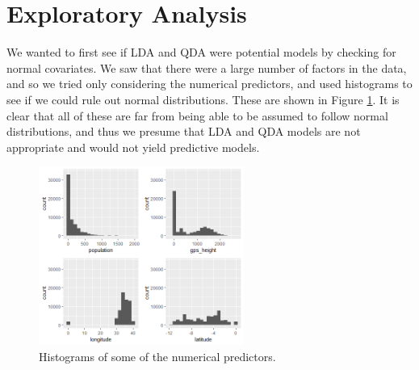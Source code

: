 \section{Exploratory Analysis} \label{explore}
We wanted to first see if LDA and QDA were potential models by checking for normal covariates.  We saw that there were a large number of factors in the data, and so we tried only considering the numerical predictors, and used histograms to see if we could rule out normal distributions.  These are shown in Figure \ref{fig:NonNormalHists}.  It is clear that all of these are far from being able to be assumed to follow normal distributions, and thus we presume that LDA and QDA models are not appropriate and would not yield predictive models.

\begin{figure}[h]
    \centering
    \includegraphics[width=0.6\textwidth]{Figures/HistsNotNormal.png}
    \caption{Histograms of some of the numerical predictors.}
    \label{fig:NonNormalHists}
\end{figure}